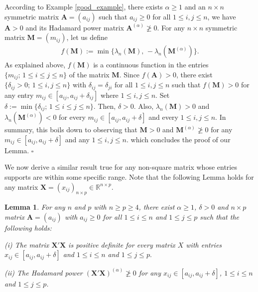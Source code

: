 \documentclass[conference,letterpaper]{IEEEtran}
\numberwithin{equation}{section}
\newcommand{\lbl}{\label}
\newcommand{\beaa}{\begin{eqnarray*}}
\newcommand{\eeaa}{\end{eqnarray*}}
\newtheorem{lemma}{{\sc Lemma}}
\begin{document}
According to Example \ref{good_example}, there exists  $\alpha \geq 1$ and an $n\times n$ symmetric matrix $\mathbf{A}=(a_{ij})$ such that $a_{ij}\geq 0$ for all $1\leq i, j \leq n$, we have $\mathbf{A}>0$ and its Hadamard power matrix $\mathbf{A}^{(\alpha)} \ngeqslant 0$. 
For any $n\times n$ symmetric matrix  $\mathbf{M}=(m_{ij})$, let us define
\beaa
f(\mathbf{M}):=\min\big\{\lambda_n(\mathbf{M}),\, -\lambda_n(\mathbf{M}^{(\alpha)})\big\}.
\eeaa
As explained above, $f(\mathbf{M})$ is a continuous function in the entries $\{m_{ij};\, 1\leq i\leq j \leq n\}$ of the matrix $\mathbf{M}$. 
Since $f(\mathbf{A})>0$, there exist $\{\delta_{ij}>0;\, 1\leq i, j\leq n\}$ with $\delta_{ij}=\delta_{ji}$ for all $1\leq i, j\leq n$ such that $f(\mathbf{M})>0$ for any entry $m_{ij}\in [a_{ij}, a_{ij}+\delta_{ij}]$ where $1\leq i, j\leq n$.
Set $\delta := \min\{\delta_{ij};\, 1\leq i\leq j\leq n\}.$ Then, $\delta>0$. Also, $\lambda_n(\mathbf{M})>0$ and $\lambda_n(\mathbf{M}^{(\alpha)})<0$ for every $m_{ij}\in [a_{ij}, a_{ij}+\delta]$ and every $1\leq i, j\leq n.$ 
In summary, this boils down to observing that $\mathbf{M}>0$  and $\mathbf{M}^{(\alpha)} \ngeqslant 0$ for any $m_{ij}\in [a_{ij}, a_{ij}+\delta]$ and any $1\leq i, j\leq n.$ which concludes the proof of our Lemma.
\hfill$\square$
\medskip

We now derive a similar result true for any non-square matrix whose entries supports are within some specific range.
Note that the following Lemma holds for any matrix $\mathbf{X}=(x_{ij})_{n\times p} \in \mathbb{R}^{n \times p}$.
\begin{lemma}\lbl{lemma:lem2} 
For any $n$ and $p$ with $n\geq p\geq 4$, there exist $\alpha \geq 1$, $\delta>0$ and $n\times p$ matrix  $\mathbf{A}=(a_{ij})$ with $a_{ij}\geq 0$ for all $1\leq i\leq n$ and $1\leq  j \leq p$ such that the following holds:

(i)  The matrix $\mathbf{X}'\mathbf{X}$ is positive definite for every matrix $X$ with entries $x_{ij}\in [a_{ij}, a_{ij}+\delta]$ and $1\leq i\leq n$ and $1\leq j \leq p.$

(ii) The Hadamard power $(\mathbf{X}'\mathbf{X})^{(\alpha)}\ngeqslant 0$  for any $x_{ij}\in [a_{ij}, a_{ij}+\delta]$, $1\leq i\leq n$ and $1\leq j \leq p$.
\end{lemma}
\medskip
\end{document}
